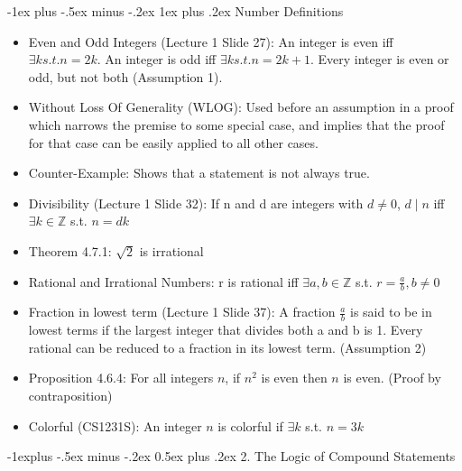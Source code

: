 \documentclass[10pt, portrait]{article}
\makeatletter
\renewcommand{\section}{\@startsection{section}{1}{0mm}%
                                {-1ex plus -.5ex minus -.2ex}%
                                {0.5ex plus .2ex}%
                                {\normalfont\large\bfseries}}
\renewcommand{\section}{\@startsection{section}{2}{0mm}%
                                {-1explus -.5ex minus -.2ex}%
                                {0.5ex plus .2ex}%
                                {\normalfont\normalsize\bfseries}}
\renewcommand{\subsection}{\@startsection{subsection}{3}{0mm}%
                                {-1ex plus -.5ex minus -.2ex}%
                                {1ex plus .2ex}%
                                {\normalfont\small\bfseries}}%
\makeatother
\begin{document}
\begin{multicols*}{2}
\subsection{Number Definitions}
\begin{itemize}
    \item Even and Odd Integers (Lecture 1 Slide 27): An integer is even iff $\exists k s.t. n = 2k$. An integer is odd iff $\exists k s.t. n = 2k+1$. Every integer is even or odd, but not both (Assumption 1).
    \item Without Loss Of Generality (WLOG): Used before an assumption in a proof which narrows the premise to some special case, and implies that the proof for that case can be easily applied to all other cases.
    \item Counter-Example: Shows that a statement is not always true.
    \item Divisibility (Lecture 1 Slide 32): If n and d are integers with $d \neq 0$, $d \mid n$ iff $\exists k \in \mathbb{Z}$ s.t. $n = dk$
    \item Theorem 4.7.1: $\sqrt{2}$ is irrational
    \item Rational and Irrational Numbers: r is rational iff $\exists a, b \in \mathbb{Z}$ s.t. $r = \frac{a}{b}, b \neq 0$
    \item Fraction in lowest term (Lecture 1 Slide 37): A fraction $\frac{a}{b}$ is said to be in lowest terms if the largest integer that divides both a and b is 1. Every rational can be reduced to a fraction in its lowest term. (Assumption 2)
    \item Proposition 4.6.4: For all integers $n$, if $n^2$ is even then $n$ is even. (Proof by contraposition)
    \item Colorful (CS1231S): An integer $n$ is colorful if $\exists k$ s.t. $n = 3k$
\end{itemize}

\section{2. The Logic of Compound Statements}

\end{multicols*}
\end{document}
